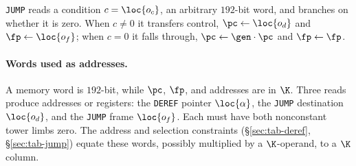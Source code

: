 \texttt{JUMP} reads a condition $c=\loc{o_c}$, an arbitrary $192$-bit word, and branches on whether it is zero. When $c\neq0$ it transfers control, $\pc\gets\loc{o_d}$ and $\fp\gets\loc{o_f}$; when $c=0$ it falls through, $\pc\gets\gen\cdot\pc$ and $\fp\gets\fp$.

\paragraph{Words used as addresses.} A memory word is $192$-bit, while $\pc$, $\fp$, and addresses are in $\K$. Three reads produce addresses or registers: the \texttt{DEREF} pointer $\loc{\alpha}$, the \texttt{JUMP} destination $\loc{o_d}$, and the \texttt{JUMP} frame $\loc{o_f}$. Each must have both nonconstant tower limbs zero. The address and selection constraints (\S\ref{sec:tab-deref}, \S\ref{sec:tab-jump}) equate these words, possibly multiplied by a $\K$-operand, to a $\K$ column.

